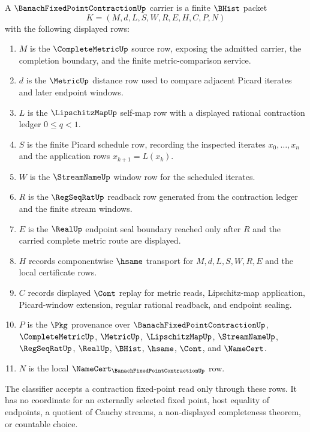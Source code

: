 \begin{definition}
\label{def:banach-fixed-point-contraction-carrier}
A $\BanachFixedPointContractionUp$ carrier is a finite $\BHist$ packet
$$
K=(M,d,L,S,W,R,E,H,C,P,N)
$$
with the following displayed rows:
\begin{enumerate}
\item $M$ is the $\CompleteMetricUp$ source row, exposing the admitted carrier, the completion boundary, and the finite metric-comparison service.
\item $d$ is the $\MetricUp$ distance row used to compare adjacent Picard iterates and later endpoint windows.
\item $L$ is the $\LipschitzMapUp$ self-map row with a displayed rational contraction ledger $0\le q<1$.
\item $S$ is the finite Picard schedule row, recording the inspected iterates $x_0,\ldots,x_n$ and the application rows $x_{k+1}=L(x_k)$.
\item $W$ is the $\StreamNameUp$ window row for the scheduled iterates.
\item $R$ is the $\RegSeqRatUp$ readback row generated from the contraction ledger and the finite stream windows.
\item $E$ is the $\RealUp$ endpoint seal boundary reached only after $R$ and the carried complete metric route are displayed.
\item $H$ records componentwise $\hsame$ transport for $M,d,L,S,W,R,E$ and the local certificate rows.
\item $C$ records displayed $\Cont$ replay for metric reads, Lipschitz-map application, Picard-window extension, regular rational readback, and endpoint sealing.
\item $P$ is the $\Pkg$ provenance over $\BanachFixedPointContractionUp$, $\CompleteMetricUp$, $\MetricUp$, $\LipschitzMapUp$, $\StreamNameUp$, $\RegSeqRatUp$, $\RealUp$, $\BHist$, $\hsame$, $\Cont$, and $\NameCert$.
\item $N$ is the local $\NameCert_{\BanachFixedPointContractionUp}$ row.
\end{enumerate}
The classifier accepts a contraction fixed-point read only through these rows. It has no coordinate for an externally selected fixed point, host equality of endpoints, a quotient of Cauchy streams, a non-displayed completeness theorem, or countable choice.
\end{definition}

